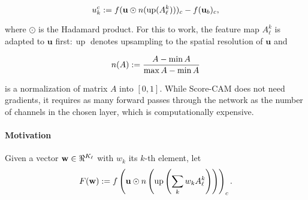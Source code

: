 \begin{equation}
	u^c_k \mathrel{:=} f(\mathbf{u} \odot n(\operatorname{up}( A^k_\ell )))_c - f(\mathbf{u}_b)_c,
\label{eq:s-cam}
\end{equation}

where $\odot$ is the Hadamard product. For this to work, the feature map $A^k_\ell$ is adapted
 to $\mathbf{u}$ first$:\operatorname{up}$ denotes upsampling to the spatial resolution of $\mathbf{u}$ and

\begin{equation}
	n(A) \mathrel{:=} \frac{A - \min A}{\max A - \min A}
\label{eq:norm}
\end{equation}

is a normalization of matrix $A$ into $[0,1]$. While Score-CAM does not need gradients, 
it requires as many forward passes through the network as the number of channels in the chosen layer,
 which is computationally expensive.


\paragraph{Motivation}
\label{sec:motiv}

Given a vector $\vw \in \real^{K_\ell}$ with $w_k$ its $k$-th element, let
\begin{equation}
	F(\mathbf{w}) \mathrel{:=} f \left( \mathbf{u} \odot n \left( \operatorname{up} \left(
		\displaystyle\sum_k w_k A^k_\ell
	\right) \right) \right)_c.
\label{eq:s-obj}
\end{equation}

